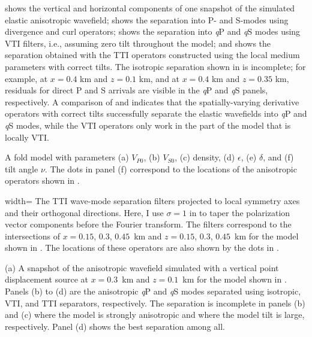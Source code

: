  shows the vertical and horizontal components of one snapshot
of the simulated elastic anisotropic wavefield;  shows the
separation into P- and S-modes using divergence and curl
operators;  shows the separation into {\it q}P and {\it q}S
modes using VTI filters, i.e., assuming zero tilt throughout the
model; and  shows the separation obtained with the TTI
operators constructed using the local medium parameters with correct
tilts. The isotropic separation shown in  is incomplete; for
example, at $x=0.4$ km and $z=0.1$ km, and at $ x=0.4$ km and $z=0.35$
km, residuals for direct P and S arrivals are visible in the {\it q}P
and {\it q}S panels, respectively. A comparison of 
and  indicates that the spatially-varying derivative operators
with correct tilts successfully separate the elastic wavefields into
{\it q}P and {\it q}S modes, while the VTI operators only work in the
part of the model that is locally VTI.

{A fold model with parameters (a) $V_{P0}$, (b) $V_{S0}$, (c) density,
(d) $\epsilon$, (e) $\delta$, and (f) tilt angle $\nu$. The dots in
panel (f) correspond to the locations of the anisotropic operators
shown in .  }


{width=\textwidth} {The TTI wave-mode separation filters projected to
local symmetry axes and their orthogonal directions. Here, I use
$\sigma=1$ in  to taper the polarization vector
components before the Fourier transform. The filters correspond to the
intersections of $x=0.15$, $0.3$, $0.45$~km and $z=0.15$, $0.3$,
$0.45$~km for the model shown
in . The locations of these
operators are also shown by the dots in .}

{(a) A snapshot of the anisotropic wavefield simulated with a vertical
point displacement source at $x=0.3$~km and $z=0.1$~km for the model
shown in {}. Panels (b) to (d)
are the anisotropic {\it q}P and {\it q}S modes separated using
isotropic, VTI, and TTI separators, respectively. The separation is
incomplete in panels (b) and (c) where the model is strongly
anisotropic and where the model tilt is large, respectively. Panel (d)
shows the best separation among all.}


